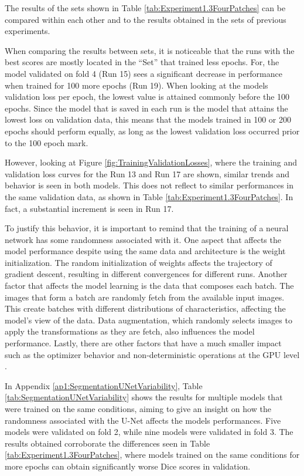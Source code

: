 The results of the sets shown in Table \ref{tab:Experiment1.3FourPatches} can be compared within each other and to the results obtained in the sets of previous experiments. 
\par
When comparing the results between sets, it is noticeable that the runs with the best scores are mostly located in the ``Set'' that trained less epochs. For, the model validated on fold 4 (Run 15) sees a significant decrease in performance when trained for 100 more epochs (Run 19). When looking at the models validation loss per epoch, the lowest value is attained commonly before the 100 epochs. Since the model that is saved in each run is the model that attains the lowest loss on validation data, this means that the models trained in 100 or 200 epochs should perform equally, as long as the lowest validation loss occurred prior to the 100 epoch mark.
\par
However, looking at Figure \ref{fig:TrainingValidationLosses}, where the training and validation loss curves for the Run 13 and Run 17 are shown, similar trends and behavior is seen in both models. This does not reflect to similar performances in the same validation data, as shown in Table \ref{tab:Experiment1.3FourPatches}. In fact, a substantial increment is seen in Run 17.
\par
To justify this behavior, it is important to remind that the training of a neural network has some randomness associated with it. One aspect that affects the model performance despite using the same data and architecture is the weight initialization. The random initialization of weights affects the trajectory of gradient descent, resulting in different convergences for different runs. Another factor that affects the model learning is the data that composes each batch. The images that form a batch are randomly fetch from the available input images. This create batches with different distributions of characteristics, affecting the model's view of the data. Data augmentation, which randomly selects images to apply the transformations as they are fetch, also influences the model performance. Lastly, there are other factors that have a much smaller impact such as the optimizer behavior and non-deterministic operations at the GPU level \parencite{Akesson2024, Altarabichi2024}. 
\par
In Appendix \ref{ap1:SegmentationUNetVariability}, Table \ref{tab:SegmentationUNetVariability} shows the results for multiple models that were trained on the same conditions, aiming to give an insight on how the randomness associated with the U-Net affects the models performances. Five models were validated on fold 2, while nine models were validated in fold 3. The results obtained corroborate the differences seen in Table \ref{tab:Experiment1.3FourPatches}, where models trained on the same conditions for more epochs can obtain significantly worse Dice scores in validation.

